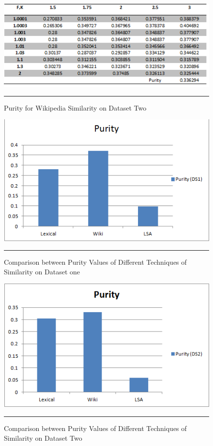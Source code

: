 \begin{figure}[htbp]
	\centering
		\includegraphics{./Figures/wiki_Purity_DS2.png}
		\rule{35em}{0.5pt}
	\caption[Purity for Wikipedia Similarity on Dataset one]{Purity for Wikipedia Similarity on Dataset Two}
	\label{fig:F8}
\end{figure}
\begin{figure}[htbp]
	\centering
		\includegraphics{./Figures/Purity_DS1.png}
		\rule{35em}{0.5pt}
	\caption[Comparison between Purity Values of Different Techniques of Similarity on Dataset one]{Comparison between Purity Values of Different Techniques of Similarity on Dataset one}
	\label{fig:F10}
\end{figure}
\begin{figure}[htbp]
	\centering
		\includegraphics{./Figures/Purity_DS2.png}
		\rule{35em}{0.5pt}
	\caption[Comparison between Purity Values of Different Techniques of Similarity on Dataset Two]{Comparison between Purity Values of Different Techniques of Similarity on Dataset Two}
	\label{fig:F11}
\end{figure}


